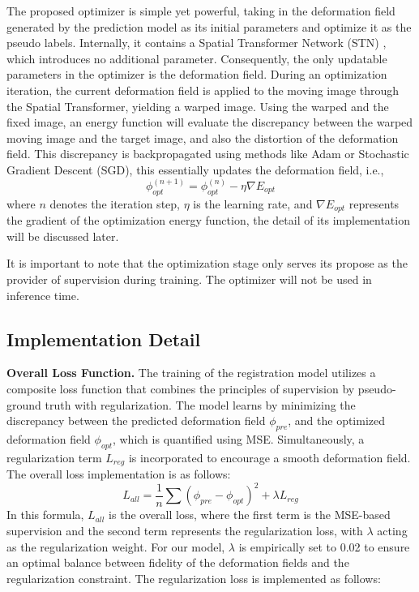 \documentclass[10pt,twocolumn,letterpaper]{article}
\begin{document}
The proposed optimizer is simple yet powerful, taking in the deformation field generated by the prediction model as its initial parameters and optimize it as the pseudo labels. Internally, it contains a Spatial Transformer Network (STN) \cite{STN}, which introduces no additional parameter. Consequently, the only updatable parameters in the optimizer is the deformation field. During an optimization iteration, the current deformation field is applied to the moving image through the Spatial Transformer, yielding a warped image. Using the warped and the fixed image, an energy function will evaluate the discrepancy between the warped moving image and the target image, and also the distortion of the deformation field. This discrepancy is backpropagated using methods like Adam \cite{kingma2017adam} or Stochastic Gradient Descent (SGD), this essentially updates the deformation field, i.e.,
\begin{equation}
    \phi_{opt}^{(n+1)} = \phi_{opt}^{(n)} - \eta \nabla E_{opt}
\end{equation}
where $n$ denotes the iteration step, $\eta$ is the learning rate, and $\nabla E_{opt}$ represents the gradient of the optimization energy function, the detail of its implementation will be discussed later.

It is important to note that the optimization stage only serves its propose as the provider of supervision during training. The optimizer will not be used in inference time.







\subsection{Implementation Detail}

\textbf{Overall Loss Function.} The training of the registration model utilizes a composite loss function that combines the principles of supervision by pseudo-ground truth with regularization. The model learns by minimizing the discrepancy between the predicted deformation field $\phi_{pre}$, and the optimized deformation field $\phi_{opt}$, which is quantified using MSE. Simultaneously, a regularization term $L_{reg}$ is incorporated to encourage a smooth deformation field. The overall loss implementation is as follows:
\begin{equation}
    L_{all} = \frac{1}{n} \sum (\phi_{pre} - \phi_{opt})^2 + \lambda L_{reg}
    \label{loss-all}
\end{equation}
In this formula, $L_{all}$ is the overall loss, where the first term is the MSE-based supervision and the second term represents the regularization loss, with $\lambda$ acting as the regularization weight. For our model, $\lambda$ is empirically set to 0.02 to ensure an optimal balance between fidelity of the deformation fields and the regularization constraint. The regularization loss is implemented as follows:
\end{document}
